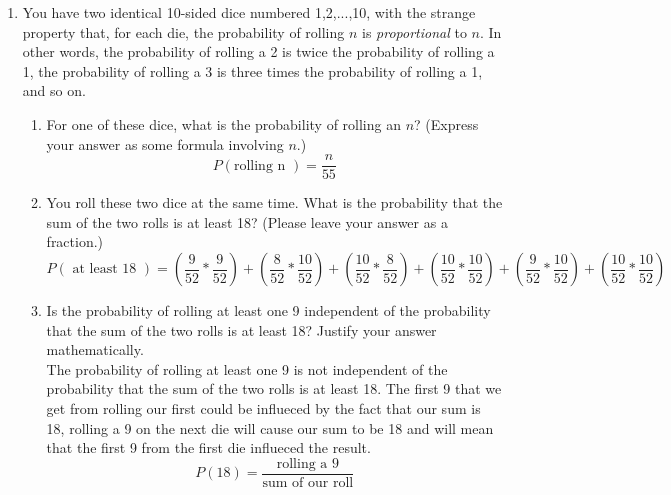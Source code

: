 \documentclass[12pt]{article}
\begin{document}
\begin{enumerate}

    \item You have two identical 10-sided dice numbered 1,2,...,10, with the strange property that, for each die, the probability of rolling $n$ is \emph{proportional} to $n$. In other words, the probability of rolling a 2 is twice the probability of rolling a 1, the probability of rolling a 3 is three times the probability of rolling a 1, and so on. 

        \begin{enumerate} 
            \item For one of these dice, what is the probability of rolling an $n$? (Express your answer as some formula involving $n$.) \\
                \[ P(\text{rolling n }) = \frac{n}{55} \]
            \item You roll these two dice at the same time. What is the probability that the sum of the two rolls is at least 18? (Please leave your answer as a fraction.) \\
                \[ P(\text{ at least 18 }) = ( \frac{9}{52} * \frac{9}{52}) + ( \frac{8}{52} * \frac{10}{52}) +( \frac{10}{52} * \frac{8}{52}) +( \frac{10}{52} * \frac{10}{52}) +( \frac{9}{52} * \frac{10}{52}) +( \frac{10}{52} * \frac{10}{52}) \] 
            \item Is the probability of rolling at least one 9 independent of the probability that the sum of the two rolls is at least 18? Justify your answer mathematically. \\ 
                The probability of rolling at least one 9 is not independent of the probability that the sum of the two rolls is at least 18. The first 9 that we get from rolling our first could be influeced by the fact that our sum is 18, rolling a 9 on the next die will cause our sum to be 18 and will mean that the first 9 from the first die influeced the result. \\
                \[ P(18) = \frac{\text{rolling a 9}}{\text{sum of our roll}} \]
        \end{enumerate}

\end{enumerate}
\end{document}
